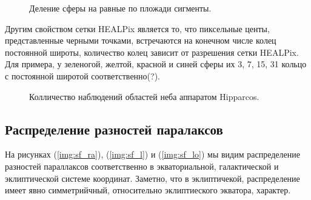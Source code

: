 \documentclass[14pt]{article} %
\begin{document}
\begin{figure}[h!]
\caption{Деление сферы на равные по пложади сигменты.}
\label{img:healpix}
\end{figure}

Другим свойством сетки HEALPix является то, что пиксельные центы, представленные черными точками, встречаются на конечном числе колец постоянной широты, количество колец зависит от разрешения сетки HEALPix. Для примера, у зеленогой, желтой, красной и синей сферы их 3, 7, 15, 31 кольцо с постоянной широтой соответственно(?).

\begin{figure}[h!]
\caption{Колличество наблюдений областей неба аппаратом Hipparcos.}
\label{img:nobs}
\end{figure}


\subsection{Распределение разностей паралаксов}\label{sub:smthhealpix}

На рисунках (\ref{img:sf_ra}), (\ref{img:sf_l}) и (\ref{img:sf_lo}) мы видим распределение разностей параллаксов соответственно в экваториальной, галактической и эклиптической системе координат. Заметно, что в эклиптичекой, распределение имеет явно симметрийчный, относительно эклиптиеского экватора, характер.
\end{document}
